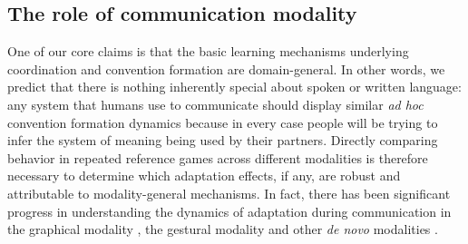 
\subsection{The role of communication modality}

One of our core claims is that the basic learning mechanisms underlying coordination and convention formation are domain-general.
In other words, we predict that there is nothing inherently special about spoken or written language: any system that humans use to communicate should display similar \emph{ad hoc} convention formation dynamics because in every case people will be trying to infer the system of meaning being used by their partners. 
Directly comparing behavior in repeated reference games across different modalities is therefore necessary to determine which adaptation effects, if any, are robust and attributable to modality-general mechanisms.
In fact, there has been significant progress in understanding the dynamics of adaptation during communication in the  graphical modality \cite{GarrodFayLeeOberlanderMacLeod07_GraphicalSymbolSystems,TheisenEtAl10_SystematicityArbitrariness,hawkins2019disentangling}, the gestural modality \cite{FayListerEllisonGoldinMeadow13_GestureBeatsVocalization,motamedi2019evolving,bohn2019young} and other \emph{de novo} modalities \cite{Galantucci05_EmergenceOfCommunication,RobertsGalantucci12_DualityOfPatterning,RobertsEtAl15_IconocityOnCombinatoriality,VerhoefRobertsDingemanse15_Iconicity,VerhoefEtAl16_TemporalLanguage,kempe2019adults}.

